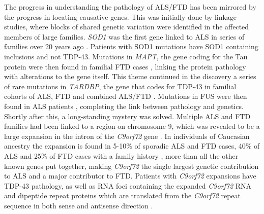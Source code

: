 The progress in understanding the pathology of ALS/FTD has been mirrored by the progress in locating causative genes. 
This was initially done by linkage studies, where blocks of shared genetic variation were identified in the affected members of large families. 
\textit{SOD1} was the first gene linked to ALS in series of families over 20 years ago \citep{Rosen1993}. 
Patients with SOD1 mutations have SOD1 containing inclusions and not TDP-43.
Mutations in \textit{MAPT}, the gene coding for the Tau protein were then found in familial FTD cases \citep{Hutton1998}, linking the protein pathology with alterations to the gene itself. 
This theme continued in the discovery a series of rare mutations in \textit{TARDBP}, the gene that codes for TDP-43 in familial cohorts of ALS, FTD and combined ALS/FTD \citep{Sreedharan2008-xv, Kabashi2008, Benajiba2009,Borroni2009}. 
Mutations in FUS were then found in ALS patients \citep{Vance2009-ye, Kwiatkowski2009}, completing the link between pathology and genetics.
Shortly after this, a long-standing mystery was solved.
Multiple ALS and FTD families had been linked to a region on chromosome 9, which was revealed to be a large expansion in the intron of the \textit{C9orf72} gene \citep{Renton2011,DeJesus-Hernandez2011}. 
In individuals of Caucasian ancestry the expansion is found in 5-10\% of sporadic ALS and FTD cases, 40\% of ALS and 25\% of FTD cases with a family history \citep{Majounie2012}, more than all the other known genes put together, making \textit{C9orf72} the single largest genetic contribution to ALS and a major contributor to FTD. 
Patients with \textit{C9orf72} expansions have TDP-43 pathology, as well as RNA foci containing the expanded \textit{C9orf72} RNA and dipeptide repeat proteins which are translated from the \textit{C9orf72} repeat sequence in both sense and antisense direction \citep{DeJesus-Hernandez2011, Renton2011}. %

